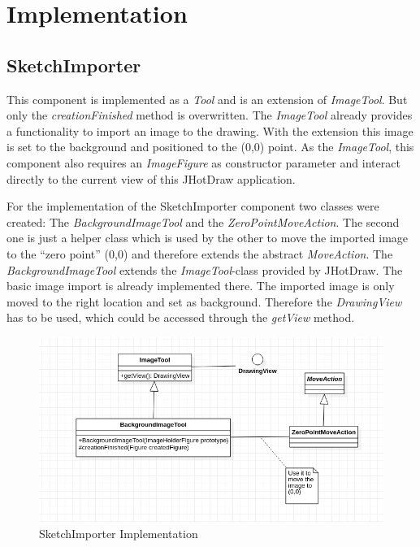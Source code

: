 \section{Implementation}

\subsection{SketchImporter}

This component is implemented as a \textit{Tool} and is an extension of \textit{ImageTool}. But only the \textit{creationFinished} method is overwritten. The \textit{ImageTool} already provides a functionality to import an image to the drawing. With the extension this image is set to the background and positioned to the (0,0) point. As the \textit{ImageTool}, this component also requires an \textit{ImageFigure} as constructor parameter and interact directly to the current view of this JHotDraw application.

For the implementation of the SketchImporter component two classes were created: The \textit{BackgroundImageTool} and the \textit{ZeroPointMoveAction}. The second one is just a helper class which is used by the other to move the imported image to the "`zero point"' (0,0) and therefore extends the abstract \textit{MoveAction}.
The \textit{BackgroundImageTool} extends the \textit{ImageTool}-class provided by JHotDraw. The basic image import is already implemented there. The imported image is only moved to the right location and set as background. Therefore the \textit{DrawingView} has to be used, which could be accessed through the \textit{getView} method.

\begin{figure}[h]
    \includegraphics[keepaspectratio,width=\textwidth]{images/SketchImporter.png}
    \caption{SketchImporter Implementation}
\end{figure}

